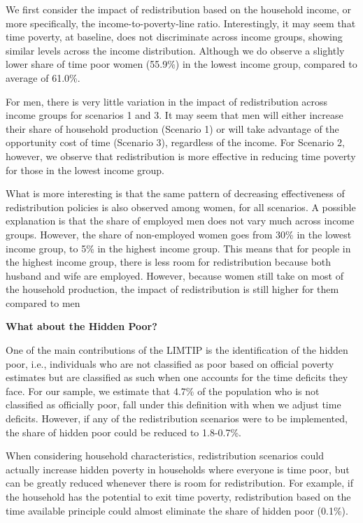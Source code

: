 \documentclass[
  11pt,
]{article}
\begin{document}
We first consider the impact of redistribution based on the household
income, or more specifically, the income-to-poverty-line ratio.
Interestingly, it may seem that time poverty, at baseline, does not
discriminate across income groups, showing similar levels across the
income distribution. Although we do observe a slightly lower share of
time poor women (55.9\%) in the lowest income group, compared to average
of 61.0\%.

For men, there is very little variation in the impact of redistribution
across income groups for scenarios 1 and 3. It may seem that men will
either increase their share of household production (Scenario 1) or will
take advantage of the opportunity cost of time (Scenario 3), regardless
of the income. For Scenario 2, however, we observe that redistribution
is more effective in reducing time poverty for those in the lowest
income group.

What is more interesting is that the same pattern of decreasing
effectiveness of redistribution policies is also observed among women,
for all scenarios. A possible explanation is that the share of employed
men does not vary much across income groups. However, the share of
non-employed women goes from 30\% in the lowest income group, to 5\% in
the highest income group. This means that for people in the highest
income group, there is less room for redistribution because both husband
and wife are employed. However, because women still take on most of the
household production, the impact of redistribution is still higher for
them compared to men

\textbf{What about the Hidden Poor?}

One of the main contributions of the LIMTIP is the identification of the
hidden poor, i.e., individuals who are not classified as poor based on
official poverty estimates but are classified as such when one accounts
for the time deficits they face. For our sample, we estimate that 4.7\%
of the population who is not classified as officially poor, fall under
this definition with when we adjust time deficits. However, if any of
the redistribution scenarios were to be implemented, the share of hidden
poor could be reduced to 1.8-0.7\%.

When considering household characteristics, redistribution scenarios
could actually increase hidden poverty in households where everyone is
time poor, but can be greatly reduced whenever there is room for
redistribution. For example, if the household has the potential to exit
time poverty, redistribution based on the time available principle could
almost eliminate the share of hidden poor (0.1\%).
\end{document}

